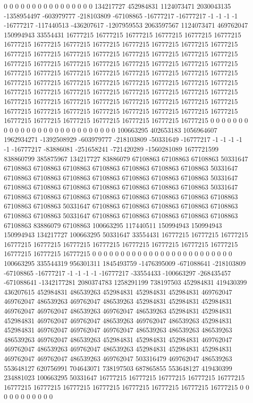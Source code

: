 0 0 0 0 0 0 0 0 0 0 0 0 0 0 0 0 134217727 452984831 1124073471 2030043135 -1358954497 -603979777 -218103809 -67108865 -16777217 -16777217 -1 -1 -1 -1 -16777217 -117440513 -436207617 -1207959553 2063597567 1124073471 469762047 150994943 33554431 16777215 16777215 16777215 16777215 16777215 16777215 16777215 16777215 16777215 16777215 16777215 16777215 16777215 16777215 16777215 16777215 16777215 16777215 16777215 16777215 16777215 16777215 16777215 16777215 16777215 16777215 16777215 16777215 16777215 16777215 16777215 16777215 16777215 16777215 16777215 16777215 16777215 16777215 16777215 16777215 16777215 16777215 16777215 16777215 16777215 16777215 16777215 16777215 16777215 16777215 16777215 16777215 16777215 16777215 16777215 16777215 16777215 16777215 16777215 16777215 16777215 16777215 16777215 16777215 16777215 16777215 16777215 16777215 16777215 16777215 16777215 16777215 16777215 16777215 16777215 16777215 16777215 0 0 0 0 0 0 0 0 0 0 0 0
0 0 0 0 0 0 0 0 0 0 0 0 0 0 0 100663295 402653183 1056964607 1962934271 -1392508929 -603979777 -218103809 -50331649 -16777217 -1 -1 -1 -1 -1 -16777217 -83886081 -251658241 -721420289 -1560281089 1677721599 838860799 385875967 134217727 83886079 67108863 67108863 67108863 50331647 67108863 67108863 67108863 67108863 67108863 67108863 67108863 50331647 67108863 67108863 67108863 67108863 67108863 67108863 67108863 50331647 67108863 67108863 67108863 67108863 67108863 67108863 67108863 50331647 67108863 67108863 67108863 67108863 67108863 67108863 67108863 67108863 67108863 67108863 50331647 67108863 67108863 67108863 67108863 67108863 67108863 67108863 50331647 67108863 67108863 67108863 67108863 67108863 67108863 83886079 67108863 100663295 117440511 150994943 150994943 150994943 134217727 100663295 50331647 33554431 16777215 16777215 16777215 16777215 16777215 16777215 16777215 16777215 16777215 16777215 16777215 16777215 16777215 16777215 0 0 0 0 0 0 0 0 0 0 0
0 0 0 0 0 0 0 0 0 0 0 0 0 0 100663295 335544319 956301311 1845493759 -1476395009 -671088641 -218103809 -67108865 -16777217 -1 -1 -1 -1 -16777217 -33554433 -100663297 -268435457 -671088641 -1342177281 2080374783 1258291199 738197503 452984831 419430399 436207615 452984831 486539263 452984831 452984831 452984831 469762047 469762047 486539263 469762047 486539263 452984831 452984831 452984831 469762047 469762047 486539263 469762047 486539263 452984831 452984831 452984831 469762047 469762047 486539263 469762047 486539263 452984831 452984831 469762047 469762047 469762047 486539263 486539263 486539263 486539263 469762047 486539263 452984831 452984831 452984831 469762047 469762047 486539263 469762047 486539263 452984831 452984831 452984831 469762047 469762047 486539263 469762047 503316479 469762047 486539263 553648127 620756991 704643071 738197503 687865855 553648127 419430399 234881023 100663295 50331647 16777215 16777215 16777215 16777215 16777215 16777215 16777215 16777215 16777215 16777215 16777215 16777215 16777215 0 0 0 0 0 0 0 0 0 0 0
